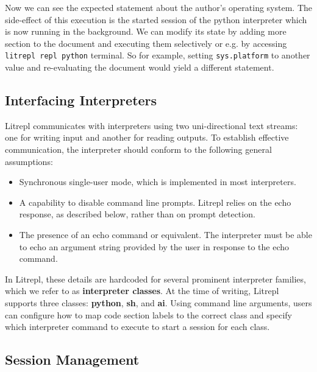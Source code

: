 \documentclass[a4paper,12pt,twocolumn]{article}
\begin{document}
Now we can see the expected statement about the author's operating system.  The
side-effect of this execution is the started session of the python interpreter
which is now running in the background. We can modify its state by adding more
section to the document and executing them selectively or e.g. by accessing
\verb|litrepl repl python| terminal. So for example, setting \verb|sys.platform|
to another value and re-evaluating the document would yield a different
statement.


\subsection{Interfacing Interpreters}

Litrepl communicates with interpreters using two uni-directional text streams:
one for writing input and another for reading outputs. To establish effective
communication, the interpreter should conform to the following general
assumptions:

\begin{itemize}
  \item Synchronous single-user mode, which is implemented in most interpreters.
  \item A capability to disable command line prompts. Litrepl relies on the echo
        response, as described below, rather than on prompt detection.
  \item The presence of an echo command or equivalent. The interpreter must be
        able to echo an argument string provided by the user in response to the
        echo command.
\end{itemize}

In Litrepl, these details are hardcoded for several prominent interpreter
families, which we refer to as \textbf{interpreter classes}. At the time of
writing, Litrepl supports three classes: \textbf{python}, \textbf{sh}, and
\textbf{ai}. Using command line arguments, users can configure how to map code
section labels to the correct class and specify which interpreter command to
execute to start a session for each class.

\subsection{Session Management}

\begin{comment}
\begin{sh}
echo -n '\begin' ; echo '{verbatim}'
echo '\begin{result}'
litrepl --python-auxdir=/tmp/litrepl/python restart python
{
cat <<EOF
import time
print('... some output ...')
time.sleep(9999)
EOF
}|litrepl --python-auxdir=/tmp/litrepl/python --timeout=1,inf eval-code python
echo '\end{result}'
echo -n '\end'; echo '{verbatim}'
\end{sh}
\end{comment}
\end{document}
